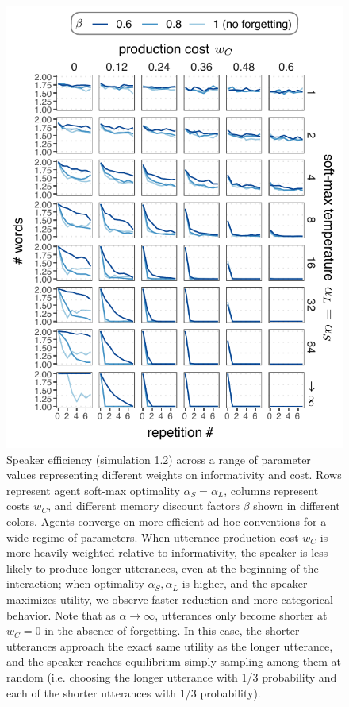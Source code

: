 \documentclass[10pt, man, floatsintext]{apa7}
\begin{document}
 \begin{figure}
\centering
    \includegraphics[scale=1.2]{conjuction_grid.pdf}
  \caption{Speaker efficiency (simulation 1.2) across a range of parameter values representing different weights on informativity and cost. Rows represent agent soft-max optimality $\alpha_S = \alpha_L$, columns represent costs $w_C$, and different memory discount factors $\beta$ shown in different colors. Agents converge on more efficient ad hoc conventions for a wide regime of parameters. When utterance production cost $w_C$ is more heavily weighted relative to informativity, the speaker is less likely to produce longer utterances, even at the beginning of the interaction; when optimality $\alpha_S, \alpha_L$ is higher, and the speaker maximizes utility, we observe faster reduction and more categorical behavior. Note that as $\alpha\rightarrow\infty$, utterances only become shorter at $w_C=0$ in the absence of forgetting. In this case, the shorter utterances approach the exact same utility as the longer utterance, and the speaker reaches equilibrium simply sampling among them at random (i.e. choosing the longer utterance with 1/3 probability and each of the shorter utterances with 1/3 probability).}
  \label{fig:conjunction_grid}
\end{figure}
\end{document}
